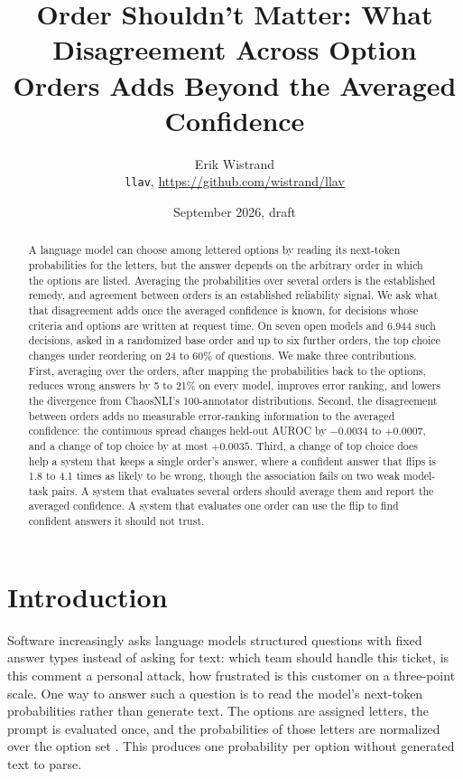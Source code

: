 \documentclass[10pt,twocolumn]{article}
\title{Order Shouldn't Matter: What Disagreement Across Option Orders Adds Beyond the Averaged Confidence}
\author{Erik Wistrand\\ \texttt{llav}, \url{https://github.com/wistrand/llav}}
\date{September 2026, draft}
\begin{document}
\maketitle

\begin{abstract}
A language model can choose among lettered options by reading its next-token probabilities for the letters, but the answer depends on the arbitrary order in which the options are listed. Averaging the probabilities over several orders is the established remedy, and agreement between orders is an established reliability signal. We ask what that disagreement adds once the averaged confidence is known, for decisions whose criteria and options are written at request time. On seven open models and 6,944 such decisions, asked in a randomized base order and up to six further orders, the top choice changes under reordering on 24 to 60\% of questions. We make three contributions. First, averaging over the orders, after mapping the probabilities back to the options, reduces wrong answers by 5 to 21\% on every model, improves error ranking, and lowers the divergence from ChaosNLI's 100-annotator distributions. Second, the disagreement between orders adds no measurable error-ranking information to the averaged confidence: the continuous spread changes held-out AUROC by $-0.0034$ to $+0.0007$, and a change of top choice by at most $+0.0035$. Third, a change of top choice does help a system that keeps a single order's answer, where a confident answer that flips is 1.8 to 4.1 times as likely to be wrong, though the association fails on two weak model-task pairs. A system that evaluates several orders should average them and report the averaged confidence. A system that evaluates one order can use the flip to find confident answers it should not trust.
\end{abstract}

\section{Introduction}

Software increasingly asks language models structured questions with fixed answer types instead of asking for text: which team should handle this ticket, is this comment a personal attack, how frustrated is this customer on a three-point scale. One way to answer such a question is to read the model's next-token probabilities rather than generate text. The options are assigned letters, the prompt is evaluated once, and the probabilities of those letters are normalized over the option set \citep{semif2026,llav2026}. This produces one probability per option without generated text to parse.
\end{document}
